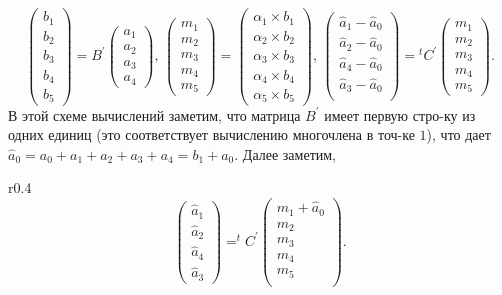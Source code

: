 \documentclass{mai_book}
\begin{document}
$$
\begin{pmatrix}
	b_1 \\ 
	b_2 \\
	b_3 \\
	b_4 \\
	b_5 
\end{pmatrix}
= B^{'}
\begin{pmatrix}
a_1\\
a_2 \\
a_3 \\
a_4 
\end{pmatrix},\,
\begin{pmatrix}
	m_1 \\
	m_2 \\
	m_3 \\
	m_4 \\
	m_5 
\end{pmatrix}
=
\begin{pmatrix}
{\alpha}_1 \times b_1 \\
{\alpha}_2 \times b_2 \\
{\alpha}_3 \times b_3 \\
{\alpha}_4 \times b_4 \\
{\alpha}_5 \times b_5 
\end{pmatrix},\,
\begin{pmatrix}
\hat{a}_1 - \hat{a}_0 \\
\hat{a}_2 - \hat{a}_0 \\
\hat{a}_4 - \hat{a}_0 \\
\hat{a}_3 - \hat{a}_0 \\
\end{pmatrix}
= {}^{t}C^{'}
\begin{pmatrix}
	m_1 \\
	m_2 \\
	m_3 \\
	m_4 \\
	m_5 
\end{pmatrix}.
$$
В этой схеме вычислений заметим, что матрица $B^{'}$ имеет первую  стро-\linebreak ку из одних единиц (это соответствует вычислению многочлена в  точ-\linebreak ке $1$), что дает $\hat{a}_0 = a_0 + a_1 + a_2 + a_3 + a_4 = b_1 + a_0$. Далее заметим,
\begin{wraptable}{r}{0.4\textwidth}
$$
\begin{pmatrix}
\hat{a}_1 \\
\hat{a}_2 \\
\hat{a}_4 \\
\hat{a}_3 
\end{pmatrix}
= ^{t}C^{'}
\begin{pmatrix}
	m_1 + \hat{a}_0 \\
	m_2 \\
	m_3 \\
	m_4 \\
	m_5 \\
\end{pmatrix}.
$$
\end{wraptable}
\end{document}
